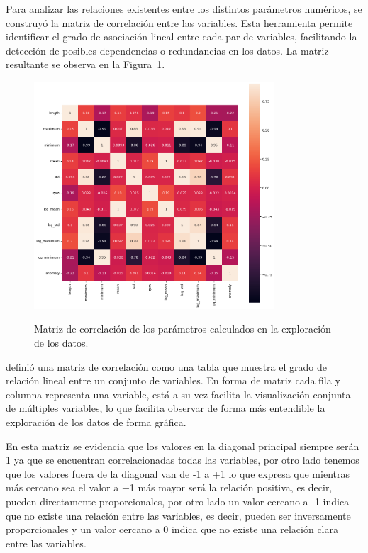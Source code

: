 \documentclass[11pt,a4paper,spanish]{book}
\numberwithin{equation}{chapter}
\numberwithin{figure}{chapter}
\begin{document}
Para analizar las relaciones existentes entre los distintos parámetros numéricos, se 
construyó la matriz de correlación entre las variables. Esta herramienta permite 
identificar el grado de asociación lineal entre cada par de variables, facilitando la 
detección de posibles dependencias o redundancias en los datos. La matriz resultante se 
observa en la Figura~\ref{fig:figCorrMat}. 


\begin{figure}[h]
    \caption{Matriz de correlación de los parámetros calculados en la exploración de los datos. }
    \centering
    \includegraphics[width=0.8\textwidth]{media/dataset/corr-mat.png}
    \label{fig:figCorrMat}
\end{figure}


\cite{Alvarez2023} definió una matriz de correlación como una tabla que muestra el grado 
de relación lineal entre un conjunto de variables. En forma de matriz cada fila y 
columna representa una variable, está a su vez facilita la visualización conjunta de 
múltiples variables, lo que facilita observar de forma más entendible la exploración de 
los datos de forma gráfica.


En esta matriz se evidencia que los valores en la diagonal principal siempre serán 1 ya 
que se encuentran correlacionadas todas las variables, por otro lado tenemos que los 
valores fuera de la diagonal van de -1 a +1 lo que expresa que mientras más cercano sea 
el valor a +1 más mayor será la relación positiva, es decir, pueden directamente 
proporcionales, por otro lado un valor cercano a -1 indica que no existe una relación 
entre las variables, es decir, pueden ser inversamente proporcionales y un valor cercano 
a 0 indica que no existe una relación clara entre las variables. \cite{Alvarez2023}
\end{document}
